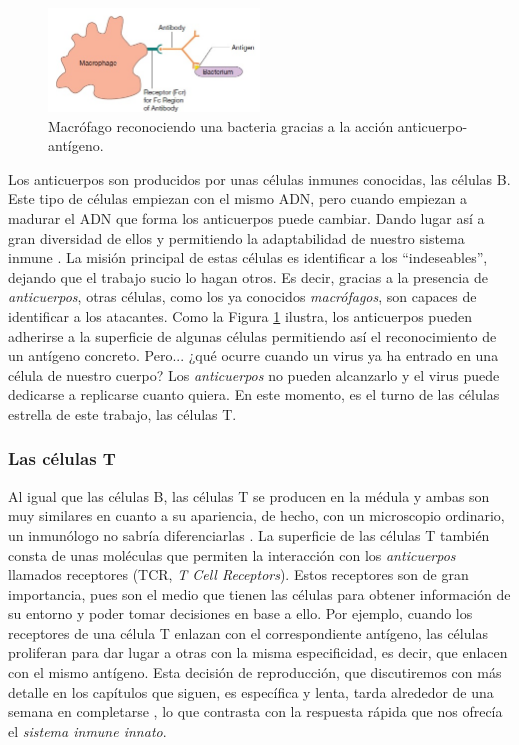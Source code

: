 \begin{figure}[t]
	\centering
	\includegraphics[width=0.5\textwidth]{2_macrofago_anticuerpo}
	\caption{Macrófago reconociendo una bacteria gracias a la acción anticuerpo-antígeno.}
	\label{fig:macrofago_anticuerpo}
\end{figure}

Los anticuerpos son producidos por unas células inmunes conocidas, las células B. Este tipo de células empiezan con el mismo ADN, pero cuando empiezan a madurar el ADN que forma los anticuerpos puede cambiar. Dando lugar así a gran diversidad de ellos y permitiendo la adaptabilidad de nuestro sistema inmune \citep{theHowItWorks}. La misión principal de estas células es identificar a los ``indeseables'', dejando que el trabajo sucio lo hagan otros. Es decir, gracias a la presencia de \textit{anticuerpos}, otras células, como los ya conocidos \textit{macrófagos}, son capaces de identificar a los atacantes. Como la Figura \ref{fig:macrofago_anticuerpo} ilustra, los anticuerpos pueden adherirse a la superficie de algunas células permitiendo así el reconocimiento de un antígeno concreto. Pero... ¿qué ocurre cuando un virus ya ha entrado en una célula de nuestro cuerpo? Los \textit{anticuerpos} no pueden alcanzarlo y el virus puede dedicarse a replicarse cuanto quiera. En este momento, es el turno de las células estrella de este trabajo, las células T. 

\subsubsection{Las células T}
Al igual que las células B, las células T se producen en la médula y ambas son muy similares en  cuanto a su apariencia, de hecho, con un microscopio ordinario, un inmunólogo no sabría diferenciarlas \citep{theHowItWorks}.  La superficie de las células T también consta de unas moléculas que permiten la interacción con los \textit{anticuerpos} llamados receptores (TCR, \textit{T Cell Receptors}). Estos receptores son de gran importancia, pues son el medio que tienen las células para obtener información de su entorno y poder tomar decisiones en base a ello. Por ejemplo, cuando los receptores de una célula T enlazan con el correspondiente antígeno, las células proliferan para dar lugar a otras con la misma especificidad, es decir, que enlacen con el mismo antígeno. Esta decisión de reproducción, que discutiremos con más detalle en los capítulos que siguen, es específica y lenta, tarda alrededor de una semana en completarse \citep{theHowItWorks}, lo que contrasta con la respuesta rápida que nos ofrecía el \textit{sistema inmune innato}.

